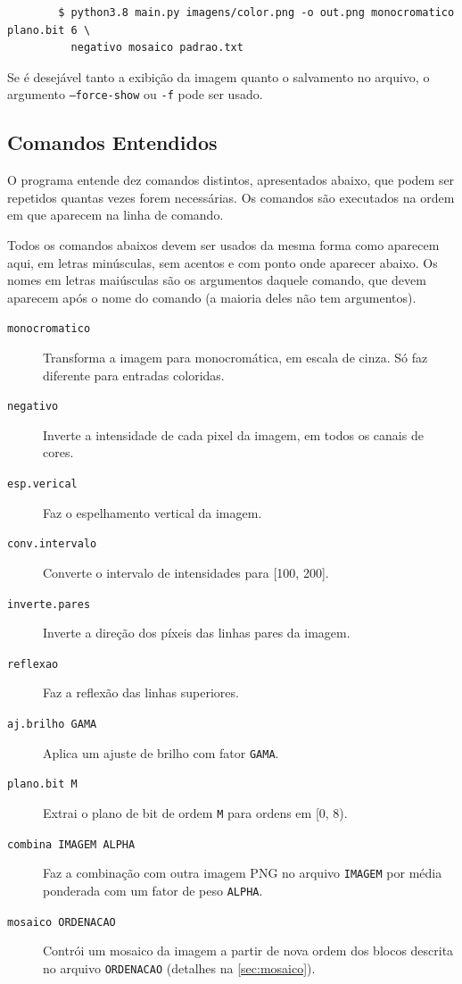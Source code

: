 \documentclass[assignment = 0]{homework}
\begin{document}
    \begin{verbatim}
        $ python3.8 main.py imagens/color.png -o out.png monocromatico plano.bit 6 \
          negativo mosaico padrao.txt
    \end{verbatim}

    Se é desejável tanto a exibição da imagem quanto o salvamento no arquivo, o argumento \texttt{--force-show} ou \texttt{-f} pode ser usado.

    \subsection{Comandos Entendidos}

    O programa entende dez comandos distintos, apresentados abaixo, que podem ser repetidos quantas vezes forem necessárias. Os comandos são executados na ordem em que aparecem na linha de comando.

    Todos os comandos abaixos devem ser usados da mesma forma como aparecem aqui, em letras minúsculas, sem acentos e com ponto onde aparecer abaixo. Os nomes em letras maiúsculas são os argumentos daquele comando, que devem aparecem após o nome do comando (a maioria deles não tem argumentos).

    \begin{description}
        \item[\texttt{monocromatico}] Transforma a imagem para monocromática, em escala de cinza. Só faz diferente para entradas coloridas.

        \item[\texttt{negativo}] Inverte a intensidade de cada pixel da imagem, em todos os canais de cores.

        \item[\texttt{esp.verical}] Faz o espelhamento vertical da imagem.

        \item[\texttt{conv.intervalo}] Converte o intervalo de intensidades para [100, 200].

        \item[\texttt{inverte.pares}] Inverte a direção dos píxeis das linhas pares da imagem.

        \item[\texttt{reflexao}] Faz a reflexão das linhas superiores.

        \item[\texttt{aj.brilho GAMA}] Aplica um ajuste de brilho com fator \texttt{GAMA}.

        \item[\texttt{plano.bit M}] Extrai o plano de bit de ordem \texttt{M} para ordens em [0, 8).

        \item[\texttt{combina IMAGEM ALPHA}] Faz a combinação com outra imagem PNG no arquivo \texttt{IMAGEM} por média ponderada com um fator de peso \texttt{ALPHA}.

        \item[\texttt{mosaico ORDENACAO}] Contrói um mosaico da imagem a partir de nova ordem dos blocos descrita no arquivo \texttt{ORDENACAO} (detalhes na \cref{sec:mosaico}).
    \end{description}
\end{document}
